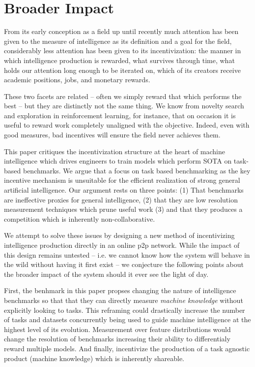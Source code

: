 \documentclass{article}
\begin{document}
\section{Broader Impact}

From its early conception as a field \cite{turing1950Machinery} up until recently \cite{chollet2019measure} much attention has been given to the measure of intelligence as its definition and a goal for the field, considerably less attention has been given to its incentivization: the manner in which intelligence production is rewarded, what survives through time, what holds our attention long enough to be iterated on, which of its creators receive academic positions, jobs, and monetary rewards. 

These two facets are related -- often we simply reward that which performs the best -- but they are distinctly not the same thing. We know from novelty search \cite{lehman2011Novelty} and exploration in reinforcement learning, for instance, that on occasion it is useful to reward work completely unaligned with the objective. Indeed, even with good measures, bad incentives will ensure the field never achieves them.   

This paper critiques the incentivization structure at the heart of machine intelligence which drives engineers to train models which perform SOTA on task-based benchmarks. We argue that a focus on task based benchmarking as the key incentive mechanism is unsuitable for the efficient realization of strong general artificial intelligence. Our argument rests on three points: (1) That benchmarks are ineffective proxies for general intelligence, (2) that they are low resolution measurement techniques which prune useful work (3) and that they produces a competition which is inherently non-collaborative. 

We attempt to solve these issues by designing a new method of incentivizing intelligence production directly in an online p2p network. While the impact of this design remains untested -- i.e. we cannot know how the system will behave in the wild without having it first exist -- we conjecture the following points about the broader impact of the system should it ever see the light of day. 

First, the benhmark in this paper propses changing the nature of intelligence benchmarks so that that they can directly measure \textit{machine knowledge} without explicitly looking to tasks. This reframing could drastically increase the number of tasks and datasets concurrently being used to guide machine intelligence at the highest level of its evolution. Measurement over feature distributions would change the resolution of benchmarks increasing their ability to differentialy reward multiple models. And finally, incentivize the production of a task agnostic product (machine knowledge) which is inherently shareable.  
\end{document}
